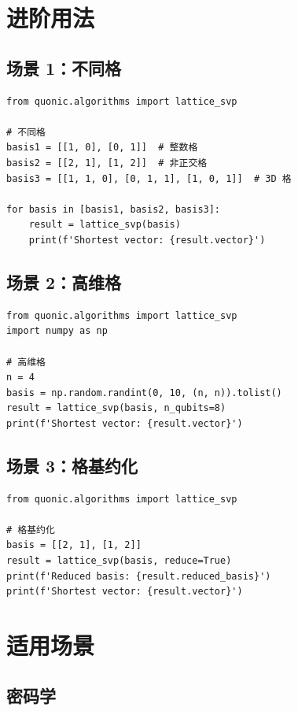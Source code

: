 \documentclass[12pt,a4paper]{article}
\begin{document}
\section{进阶用法}

\subsection{场景 1：不同格}

\begin{verbatim}
from quonic.algorithms import lattice_svp

# 不同格
basis1 = [[1, 0], [0, 1]]  # 整数格
basis2 = [[2, 1], [1, 2]]  # 非正交格
basis3 = [[1, 1, 0], [0, 1, 1], [1, 0, 1]]  # 3D 格

for basis in [basis1, basis2, basis3]:
    result = lattice_svp(basis)
    print(f'Shortest vector: {result.vector}')
\end{verbatim}

\subsection{场景 2：高维格}

\begin{verbatim}
from quonic.algorithms import lattice_svp
import numpy as np

# 高维格
n = 4
basis = np.random.randint(0, 10, (n, n)).tolist()
result = lattice_svp(basis, n_qubits=8)
print(f'Shortest vector: {result.vector}')
\end{verbatim}

\subsection{场景 3：格基约化}

\begin{verbatim}
from quonic.algorithms import lattice_svp

# 格基约化
basis = [[2, 1], [1, 2]]
result = lattice_svp(basis, reduce=True)
print(f'Reduced basis: {result.reduced_basis}')
print(f'Shortest vector: {result.vector}')
\end{verbatim}

\section{适用场景}

\subsection{密码学}
\end{document}
